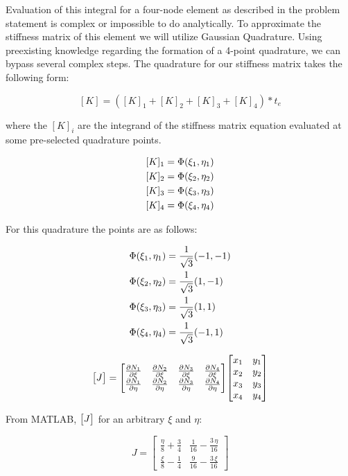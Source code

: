 \documentclass[../main.tex]{subfiles}
\begin{document}
Evaluation of this integral for a four-node element as described in the problem statement is complex or impossible to do analytically.
To approximate the stiffness matrix of this element we will utilize Gaussian Quadrature.
Using preexisting knowledge regarding the formation of a 4-point quadrature, we can bypass several complex steps.
The quadrature for our stiffness matrix takes the following form:

\[
    [K] = ([K]_1 + [K]_2 + [K]_3 + [K]_4)*t_e  
\]

where the \([K]_i\) are the integrand of the stiffness matrix equation evaluated at some pre-selected quadrature points.

\begin{align*}
    \centering
    [K]_1 &= \Phi(\xi_1,\eta_1)\\
    [K]_2 &= \Phi(\xi_2,\eta_2)\\
    [K]_3 &= \Phi(\xi_3,\eta_3)\\
    [K]_4 &= \Phi(\xi_4,\eta_4)
\end{align*}

For this quadrature the points are as follows:

\begin{align*}
    \centering
    \Phi(\xi_1,\eta_1) &= \frac{1}{\sqrt{3}}(-1,-1)\\
    \Phi(\xi_2,\eta_2) &= \frac{1}{\sqrt{3}}(1,-1)\\
    \Phi(\xi_3,\eta_3) &= \frac{1}{\sqrt{3}}(1,1)\\
    \Phi(\xi_4,\eta_4) &= \frac{1}{\sqrt{3}}(-1,1)
\end{align*}

\[
    \mqty[J]
    =
    \mqty[
        \pdv{N_1}{\xi} & \pdv{N_2}{\xi} & \pdv{N_3}{\xi} & \pdv{N_4}{\xi}\\
        \pdv{N_1}{\eta} & \pdv{N_2}{\eta} & \pdv{N_3}{\eta} & \pdv{N_4}{\eta}
        ]  
    \mqty[
        x_1 & y_1\\
        x_2 & y_2\\
        x_3 & y_3\\
        x_4 & y_4
    ]
\]

From MATLAB, \(\mqty[J]\) for an arbitrary \(\xi\) and \(\eta\):

\[
J =
\left[\begin{array}{cc} \frac{\eta}{8}+\frac{3}{4} & \frac{1}{16}-\frac{3\,\eta}{16}\\ \frac{\xi}{8}-\frac{1}{4} & \frac{9}{16}-\frac{3\,\xi}{16} \end{array}\right]
\]
\end{document}
